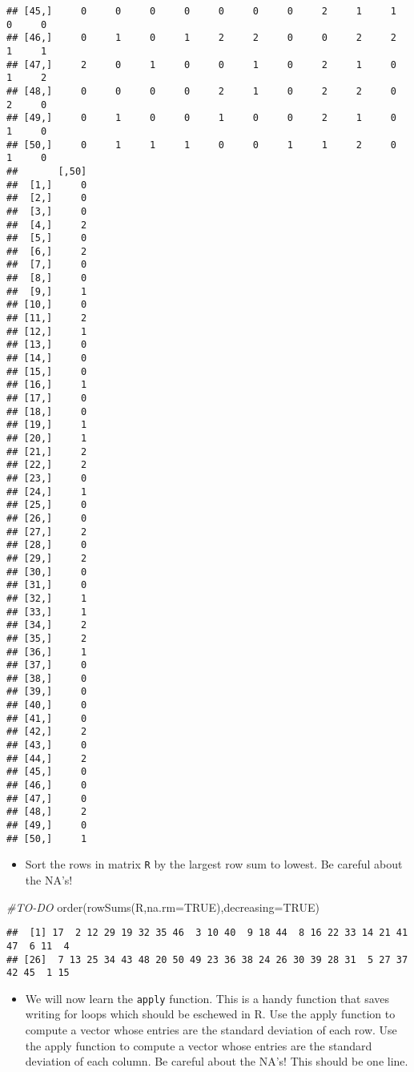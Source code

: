 \documentclass[
]{article}
\newenvironment{Shaded}{\begin{snugshade}}{\end{snugshade}}
\newcommand{\AttributeTok}[1]{\textcolor[rgb]{0.77,0.63,0.00}{#1}}
\newcommand{\CommentTok}[1]{\textcolor[rgb]{0.56,0.35,0.01}{\textit{#1}}}
\newcommand{\ConstantTok}[1]{\textcolor[rgb]{0.00,0.00,0.00}{#1}}
\newcommand{\FunctionTok}[1]{\textcolor[rgb]{0.00,0.00,0.00}{#1}}
\newcommand{\NormalTok}[1]{#1}
\providecommand{\tightlist}{%
  \setlength{\itemsep}{0pt}\setlength{\parskip}{0pt}}
\begin{document}
\begin{verbatim}
## [45,]     0     0     0     0     0     0     0     2     1     1     0     0
## [46,]     0     1     0     1     2     2     0     0     2     2     1     1
## [47,]     2     0     1     0     0     1     0     2     1     0     1     2
## [48,]     0     0     0     0     2     1     0     2     2     0     2     0
## [49,]     0     1     0     0     1     0     0     2     1     0     1     0
## [50,]     0     1     1     1     0     0     1     1     2     0     1     0
##       [,50]
##  [1,]     0
##  [2,]     0
##  [3,]     0
##  [4,]     2
##  [5,]     0
##  [6,]     2
##  [7,]     0
##  [8,]     0
##  [9,]     1
## [10,]     0
## [11,]     2
## [12,]     1
## [13,]     0
## [14,]     0
## [15,]     0
## [16,]     1
## [17,]     0
## [18,]     0
## [19,]     1
## [20,]     1
## [21,]     2
## [22,]     2
## [23,]     0
## [24,]     1
## [25,]     0
## [26,]     0
## [27,]     2
## [28,]     0
## [29,]     2
## [30,]     0
## [31,]     0
## [32,]     1
## [33,]     1
## [34,]     2
## [35,]     2
## [36,]     1
## [37,]     0
## [38,]     0
## [39,]     0
## [40,]     0
## [41,]     0
## [42,]     2
## [43,]     0
## [44,]     2
## [45,]     0
## [46,]     0
## [47,]     0
## [48,]     2
## [49,]     0
## [50,]     1
\end{verbatim}

\begin{itemize}
\tightlist
\item
  Sort the rows in matrix \texttt{R} by the largest row sum to lowest.
  Be careful about the NA's!
\end{itemize}

\begin{Shaded}
\begin{Highlighting}[]
\CommentTok{\#TO{-}DO}
\FunctionTok{order}\NormalTok{(}\FunctionTok{rowSums}\NormalTok{(R,}\AttributeTok{na.rm=}\ConstantTok{TRUE}\NormalTok{),}\AttributeTok{decreasing=}\ConstantTok{TRUE}\NormalTok{)}
\end{Highlighting}
\end{Shaded}

\begin{verbatim}
##  [1] 17  2 12 29 19 32 35 46  3 10 40  9 18 44  8 16 22 33 14 21 41 47  6 11  4
## [26]  7 13 25 34 43 48 20 50 49 23 36 38 24 26 30 39 28 31  5 27 37 42 45  1 15
\end{verbatim}

\begin{itemize}
\tightlist
\item
  We will now learn the \texttt{apply} function. This is a handy
  function that saves writing for loops which should be eschewed in R.
  Use the apply function to compute a vector whose entries are the
  standard deviation of each row. Use the apply function to compute a
  vector whose entries are the standard deviation of each column. Be
  careful about the NA's! This should be one line.
\end{itemize}
\end{document}
